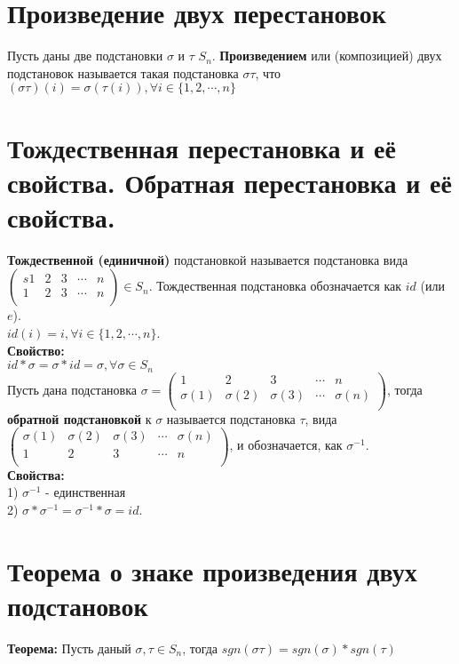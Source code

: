 \documentclass[a4paper,11pt]{report}
\begin{document}
\section{Произведение двух перестановок}
Пусть даны две подстановки $\sigma$ и $\tau$ \in $S_n$. \textbf{Произведением} или (композицией) двух подстановок называется
такая подстановка $\sigma\tau$, что $(\sigma\tau)(i) = \sigma(\tau(i)), \forall i \in \{1, 2, \cdots, n\}$
\section{Тождественная перестановка и её свойства. Обратная перестановка и её свойства.}
\textbf{Тождественной (единичной)} подстановкой называется подстановка вида $
\begin{pmatrix}s
 1 & 2 & 3 & \cdots & n\\
 1 & 2 & 3 & \cdots & n\\
\end{pmatrix}
\in S_n$. Тождественная подстановка обозначается как $id$ (или $e$).\\
$id(i) = i, \forall i \in \{1, 2, \cdots, n\}$.\\
\textbf{Свойство:}\\
$id * \sigma = \sigma * id = \sigma, \forall \sigma \in S_n$\\
Пусть дана подстановка $\sigma = 
\begin{pmatrix}
 1 & 2 & 3 & \cdots & n\\
 \sigma(1) & \sigma(2) & \sigma(3) & \cdots & \sigma(n)\\
\end{pmatrix}$,
тогда \textbf{обратной подстановкой} к $\sigma$ называется подстановка
$\tau$, вида 
$
\begin{pmatrix}
 \sigma(1) & \sigma(2) & \sigma(3) & \cdots & \sigma(n)\\
 1 & 2 & 3 & \cdots & n\\
\end{pmatrix}
$, и обозначается, как $\sigma^{-1}$.\\
\textbf{Свойства:}\\
1) $\sigma^{-1}$ - единственная\\
2) $\sigma * \sigma^{-1} = \sigma^{-1} * \sigma = id$.\\
\section{Теорема о знаке произведения двух подстановок}
\textbf{Теорема:} Пусть даный $\sigma, \tau \in S_n$, тогда $sgn(\sigma\tau) = sgn(\sigma) * sgn(\tau)$\\
\end{document}

